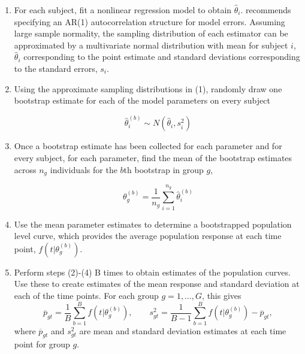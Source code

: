 \begin{enumerate}
\vspace{-3mm}
\item For each subject, fit a nonlinear regression model to obtain $\hat{\theta}_i$. \citet{oleson2017detecting} recommends specifying an AR(1) autocorrelation structure for model errors. Assuming large sample normality, the sampling distribution of each estimator can be approximated by a multivariate normal distribution with mean for subject $i$, $\hat{\theta}_i$ corresponding to the point estimate and standard deviations corresponding to the standard errors, $s_i$.

\item Using the approximate sampling distributions in (1), randomly draw one bootstrap estimate for each of the model parameters on every subject 

\begin{equation}
\hat{\theta}_i^{(b)} \sim N( \hat{\theta}_i, s_i^2)
\end{equation}

\item Once a bootstrap estimate has been collected for each parameter and for every subject, for each parameter, find the mean of the bootstrap estimates across $n_g$ individuals for the $b$th bootstrap in group $g$,

\begin{equation}
\theta_g^{(b)} = \frac{1}{n_g} \sum_{i=1}^{n_g} \hat{\theta}_i^{(b)}
\end{equation}

\item Use the mean parameter estimates to determine a bootstrapped population level curve, which provides the average population response at each time point, $f(t| \theta_g^{(b)})$.

\item Perform steps (2)-(4) B times to obtain estimates of the population curves. Use these to create estimates of the mean response and standard deviation at each of the time points. For each group $g = 1, \dots, G$, this gives
\begin{equation}
\overline{p}_{gt} = \frac1B \sum_{b=1}^B f(t| \theta_g^{(b)}), \qquad s_{gt}^2 = \frac{1}{B-1} \sum_{b=1}^B  f(t| \theta_g^{(b)}) - \overline{p}_{gt},
\end{equation}
where $\overline{p}_{gt}$ and $s_{gt}^2$ are mean and standard deviation estimates at each time point for group $g$.
\end{enumerate}

